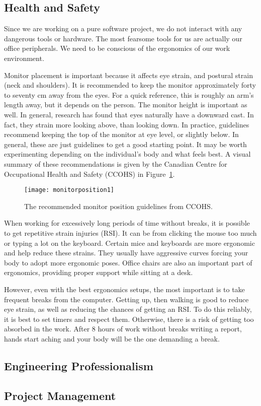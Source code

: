 \subsection{Health and Safety}\label{subsec:healthnsafety}

Since we are working on a pure software project,
we do not interact with any dangerous tools or hardware.
The most fearsome tools for us are actually our office peripherals.
We need to be conscious of the ergonomics of our work environment.


Monitor placement is important because it affects eye strain, and postural strain (neck and shoulders).
It is recommended to keep the monitor approximately forty to seventy cm away from the eyes.
For a quick reference, this is roughly an arm's length away, but it depends on the person.
The monitor height is important as well.
In general, research has found that eyes naturally have a downward cast. %
In fact, they strain more looking above, than looking down.
In practice, guidelines recommend keeping the top of the monitor at eye level, or slightly below.
In general, these are just guidelines to get a good starting point.
It may be worth experimenting depending on the individual's body and what feels best.
A visual summary of these recommendations is given by the Canadian Centre for Occupational Health and Safety (CCOHS) in Figure~\ref{fig:monitor-pos}. %
\begin{figure}[h]
    \centering
    \texttt{[image: monitorposition1]}
    \caption{The recommended monitor position guidelines from CCOHS.}
    \label{fig:monitor-pos}
\end{figure}

When working for excessively long periods of time without breaks,
it is possible to get repetitive strain injuries (RSI).
It can be from clicking the mouse too much or typing a lot on the keyboard.
Certain mice and keyboards are more ergonomic and help reduce these strains.
They usually have aggressive curves forcing your body to adopt more ergonomic poses.
Office chairs are also an important part of ergonomics, providing proper support while sitting at a desk.

However, even with the best ergonomics setups, the most important is to take frequent breaks from the computer.
Getting up, then walking is good to reduce eye strain, as well as reducing the chances of getting an RSI.
To do this reliably, it is best to set timers and respect them.
Otherwise, there is a risk of getting too absorbed in the work.
After 8 hours of work without breaks writing a report, hands start aching and your body will be the one demanding a break.


\subsection{Engineering Professionalism}\label{subsec:engineering-professionalism}

\subsection{Project Management}\label{subsec:project-management}

